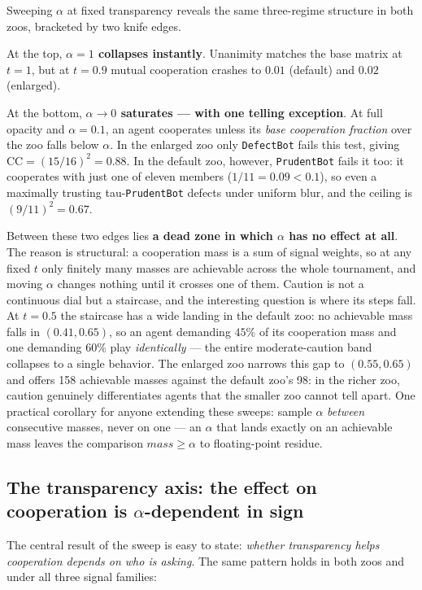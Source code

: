 \documentclass[11pt]{article}
\newcommand{\zoobot}[1]{\texttt{#1}}
\begin{document}
Sweeping $\alpha$ at fixed transparency reveals the same three-regime
structure in both zoos, bracketed by two knife edges.

At the top, \textbf{$\alpha = 1$ collapses instantly}. Unanimity matches
the base matrix at $t = 1$, but at $t = 0.9$ mutual cooperation crashes to
$0.01$ (default) and $0.02$ (enlarged).

At the bottom, \textbf{$\alpha \to 0$ saturates --- with one telling
exception}. At full opacity and $\alpha = 0.1$, an agent cooperates unless
its \emph{base cooperation fraction} over the zoo falls below $\alpha$. In
the enlarged zoo only \zoobot{DefectBot} fails this test, giving
$\mathrm{CC} = (15/16)^2 = 0.88$. In the default zoo, however,
\zoobot{PrudentBot} fails it too: it cooperates with just one of eleven
members ($1/11 = 0.09 < 0.1$), so even a maximally trusting
tau-\zoobot{PrudentBot} defects under uniform blur, and the ceiling is
$(9/11)^2 = 0.67$.

Between these two edges lies \textbf{a dead zone in which $\alpha$ has no
effect at all}. The reason is structural: a cooperation mass is a sum of
signal weights, so at any fixed $t$ only finitely many masses are
achievable across the whole tournament, and moving $\alpha$ changes
nothing until it crosses one of them. Caution is not a continuous dial but
a staircase, and the interesting question is where its steps fall. At
$t = 0.5$ the staircase has a wide landing in the default zoo: no
achievable mass falls in $(0.41, 0.65)$, so an agent demanding $45\%$ of
its cooperation mass and one demanding $60\%$ play \emph{identically} ---
the entire moderate-caution band collapses to a single behavior. The
enlarged zoo narrows this gap to $(0.55, 0.65)$ and offers 158 achievable
masses against the default zoo's 98: in the richer zoo, caution genuinely
differentiates agents that the smaller zoo cannot tell apart. One
practical corollary for anyone extending these sweeps: sample $\alpha$
\emph{between} consecutive masses, never on one --- an $\alpha$ that lands
exactly on an achievable mass leaves the comparison
$\mathit{mass} \ge \alpha$ to floating-point residue.

\subsection{The transparency axis: the effect on cooperation is
$\alpha$-dependent in sign}

The central result of the sweep is easy to state: \emph{whether
transparency helps cooperation depends on who is asking}. The same pattern
holds in both zoos and under all three signal families:
\end{document}
